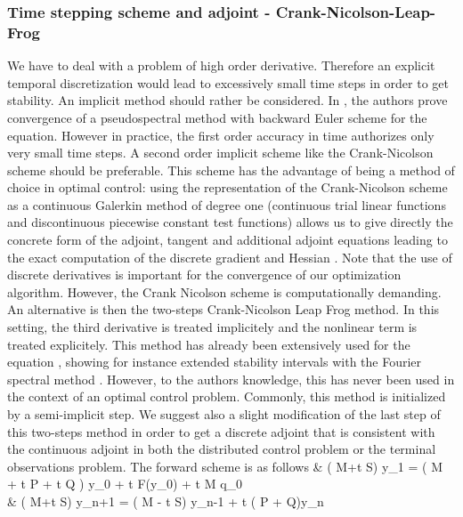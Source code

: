 \subsubsection{Time stepping scheme and adjoint - Crank-Nicolson-Leap-Frog}
We have to deal with a problem of high order derivative. Therefore an explicit temporal discretization would lead to excessively small time steps in order to get stability. An implicit method should rather be considered. In \cite{li2000error}, the authors prove convergence of a pseudospectral method with backward Euler scheme for the \KdV equation. However in practice, the first order accuracy in time authorizes only very small time steps. A second order implicit scheme like the Crank-Nicolson scheme should be preferable. This scheme has the advantage of being a method of choice in optimal control: using the representation of the Crank-Nicolson scheme as a continuous Galerkin method of degree one (continuous trial linear functions and discontinuous piecewise constant test functions) allows us to give directly the concrete form of the adjoint, tangent and additional adjoint equations leading to the exact computation of the discrete gradient and Hessian \cite{meidner2007adaptive}. Note that the use of discrete derivatives is important for the convergence of our optimization algorithm. However, the Crank Nicolson scheme is computationally demanding. An alternative is then the two-steps Crank-Nicolson Leap Frog method. In this setting, the third derivative is treated implicitely and the nonlinear term is treated explicitely. This method has already been extensively used for the \KdV equation \cite{shen2003new,ma2000legendre,ma2001optimal}, showing for instance extended stability intervals with the Fourier spectral method \cite{chan1985fourier}. However, to the authors knowledge, this has never been used in the context of an optimal control problem. Commonly, this method is initialized by a semi-implicit step. We suggest also a slight modification of the last step of this two-steps method in order to get a discrete adjoint that is consistent with the continuous adjoint in both the distributed control problem or the terminal observations problem. The forward scheme is as follows
\bealn
& \left( M+\Delta t S\right) y_1 = \left( M + \Delta t P + \gamma \Delta t Q \right) y_0 + \Delta t F(y_0) + \Delta t M q_0 \\
& \left( M+\Delta t S\right) y_{n+1} = \left( M - \Delta t S\right) y_{n-1} +  \Delta t \left( P + \gamma Q\right)y_n \\
